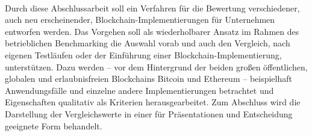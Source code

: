 
\hspace{1em}\,\vspace{3em}

Durch diese Abschlussarbeit soll ein Verfahren für die Bewertung verschiedener, auch neu erscheinender, Blockchain-Implementierungen für Unternehmen entworfen werden.
Das Vorgehen soll als wiederholbarer Ansatz im Rahmen des betrieblichen Benchmarking die Auswahl vorab und auch den Vergleich, \zB{} nach eigenen Testläufen oder der Einführung einer Blockchain-Implementierung, unterstützen.
Dazu werden -- vor dem Hintergrund der beiden großen öffentlichen, globalen und erlaubnisfreien Blockchains Bitcoin und Ethereum -- beispielhaft Anwendungsfälle und einzelne andere Implementierungen betrachtet und Eigenschaften qualitativ als Kriterien herausgearbeitet. Zum Abschluss wird die Darstellung der Vergleichswerte in einer für Präsentationen und Entscheidung geeignete Form behandelt. 

